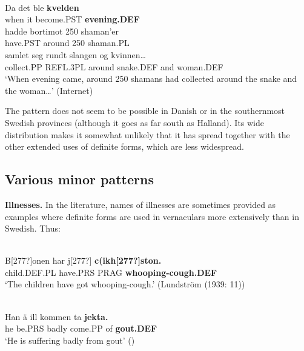 
\ea \label{} 
\\
\gll Da  det  ble  \textbf{kvelden} \\
when  it  become.PST  \textbf{evening.DEF} \\
\gll hadde  bortimot  250  shaman’er\\
have.PST  around  250  shaman.PL\\
\gll samlet  seg  rundt  slangen  og  kvinnen…\\
collect.PP  REFL.3PL  around  snake.DEF  and  woman.DEF\\
\glt ‘When evening came, around 250 shamans had collected around the snake and the woman…’ (Internet)

\z

The pattern does not seem to be possible in Danish or in the southernmost Swedish provinces (although it goes as far south as Halland). Its wide distribution makes it somewhat unlikely that it has spread together with the other extended uses of definite forms, which are less widespread. 


\subsection{ Various minor patterns}

\textbf{Illnesses.} In the literature, names of illnesses are sometimes provided as examples where definite forms are used in vernaculars more extensively than in Swedish. Thus: 


\ea \label{} 
\\
\gll B[277?]onen  har  j[277?]  \textbf{c(ikh[277?]ston.}\\
child.DEF.PL  have.PRS  PRAG  \textbf{whooping-cough.DEF}\\
\glt ‘The children have got whooping-cough.’ (Lundström (1939: 11))

\z

\ea \label{} 
\\
\gll Han  ä  ill  kommen  ta  \textbf{jekta.}\\
he  be.PRS  badly  come.PP  of  \textbf{gout.DEF}\\
  ‘He is suffering badly from gout’ (\citet{Broberg1936})
\z 
  
